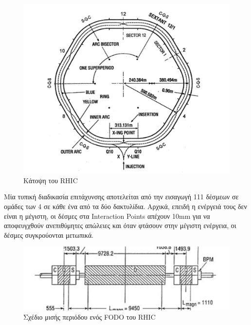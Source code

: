 	\begin{figure}[h!] 
		\centering
		\includegraphics[scale=0.5]{Accelerating_System/RHIC_schem.png}
		\caption{Κάτοψη του RHIC }
		\label{fig2.7}
	\end{figure}
	
	
	Μία τυπική διαδικασία επιτάχυνσης αποτελείται από την εισαγωγή 111 δέσμεων σε ομάδες των 4 σε κάθε ένα από τα δύο δακτυλίδια. Αρχικά, επειδή η ενέργειά τους δεν είναι η μέγιστη,  οι δέσμες στα Interaction Points απέχουν 10mm για να αποφευγχθούν ανεπιθύμητες απώλειες και όταν φτάσουν στην μέγιστη ενέργεια, οι δέσμες συγκρούονται μετωπικά. 
	
	\begin{figure}[h!]
		\centering 
		\includegraphics[scale=0.5]{Accelerating_System/RHIC_half_cells.png}
		\caption{ Σχέδιο μισής περιόδου ενός FODO του RHIC}
		\label{fig2.8}
	\end{figure}
	
